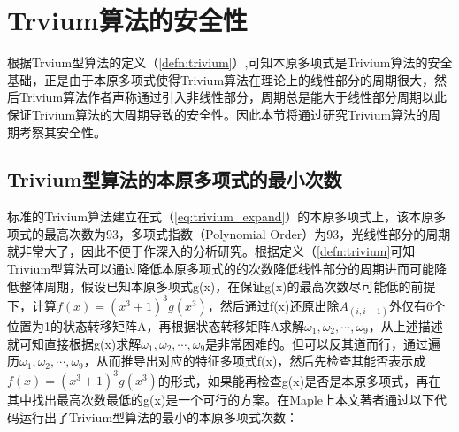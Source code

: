 \section{Trvium算法的安全性}
根据Trvium型算法的定义（\ref{defn:trivium}）,可知本原多项式是Trivium算法的安全基础，正是由于本原多项式使得Trivium算法在理论上的线性部分的周期很大，然后Trivium算法作者声称通过引入非线性部分，周期总是能大于线性部分周期以此保证Trivium算法的大周期导致的安全性。因此本节将通过研究Trivium算法的周期考察其安全性。

\subsection{Trivium型算法的本原多项式的最小次数}
标准的Trivium算法建立在式（\ref{eq:trivium_expand}）的本原多项式上，该本原多项式的最高次数为93，多项式指数（Polynomial Order）为93，光线性部分的周期就非常大了，因此不便于作深入的分析研究。根据定义（\ref{defn:trivium}可知Trivium型算法可以通过降低本原多项式的的次数降低线性部分的周期进而可能降低整体周期，假设已知本原多项式g(x)，在保证g(x)的最高次数尽可能低的前提下，计算$f(x)=(x^{3}+1)^{3}g(x^{3})$，然后通过f(x)还原出除$A_{(i,i-1)}$外仅有6个位置为1的状态转移矩阵A，再根据状态转移矩阵A求解$\omega_{1},\omega_{2},\cdots,\omega_{9}$，从上述描述就可知直接根据g(x)求解$\omega_{1},\omega_{2},\cdots,\omega_{9}$是非常困难的。但可以反其道而行，通过遍历$\omega_{1},\omega_{2},\cdots,\omega_{9}$，从而推导出对应的特征多项式f(x)，然后先检查其能否表示成$f(x)=(x^{3}+1)^{3}g(x^{3})$的形式，如果能再检查g(x)是否是本原多项式，再在其中找出最高次数最低的g(x)是一个可行的方案。在Maple上本文著者通过以下代码运行出了Trivium型算法的最小的本原多项式次数：

